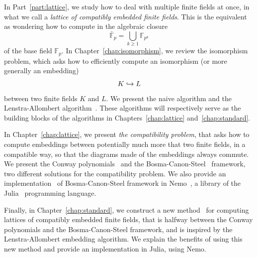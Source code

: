 In Part~\ref{part:lattice}, we study how to deal with multiple finite fields
at once, in what we call a \emph{lattice of compatibly embedded finite fields}.
This is the equivalent as wondering how to compute in the algebraic closure
\[
  \bar{\mathbb{F}}_{p} = \bigcup_{k\geq1}\mathbb{F}_{p^k}
\]
of the base field $\mathbb{F}_p$. In Chapter~\ref{chap:isomorphism}, we review
the isomorphism problem, which asks how to efficiently compute an isomorphism
(or more generally an embedding)
\[
  K \hookrightarrow L
\]
between two finite fields $K$ and $L$. We present the naive algorithm and the
Lenstra-Allombert algorithm~\cite{Lenstra91, Allombert02}. These algorithms will
respectively serve as the building blocks of the algorithms in
Chapters~\ref{chap:lattice} and~\ref{chap:standard}.

In Chapter~\ref{chap:lattice}, we present \emph{the compatibility problem}, that
asks how to compute embeddings between potentially much more that two finite
fields, in a compatible way, \ie so that the diagrams made of the embeddings
always commute. We present the Conway polynomials~\cite{Parker90, Scheerhorn92}
and the Bosma-Canon-Steel~\cite{BCS97}
framework, two different solutions for the compatibility problem. We also
provide an implementation~\cite{DRR18} of Bosma-Canon-Steel framework in
Nemo~\cite{Nemo}, a library of the Julia~\cite{Julia} programming language.

Finally, in Chapter~\ref{chap:standard}, we construct a new method~\cite{DRR19}
for computing lattices of compatibly embedded finite fields, that is halfway
between the Conway polynomials and the Bosma-Canon-Steel framework, and is
inspired by the Lenstra-Allombert embedding algorithm. We explain the benefits
of using this new method and provide an implementation in Julia, using Nemo.
